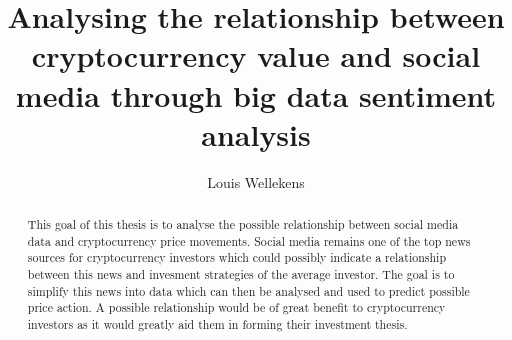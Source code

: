 \documentclass[english]{hogent-article}
\title{Analysing the relationship between cryptocurrency value and social media through big data sentiment analysis}
\author{Louis Wellekens}
\begin{document}
\begin{abstract}
  This goal of this thesis is to analyse the possible relationship between social media data and cryptocurrency price movements. Social media remains one of the top news sources for cryptocurrency investors which could possibly indicate a relationship between this news and invesment strategies of the average investor. The goal is to simplify this news into data which can then be analysed and used to predict possible price action. A possible relationship would be of great benefit to cryptocurrency investors as it would greatly aid them in forming their investment thesis.
\end{abstract}

\tableofcontents



\printbibliography[heading=bibintoc]
\end{document}
